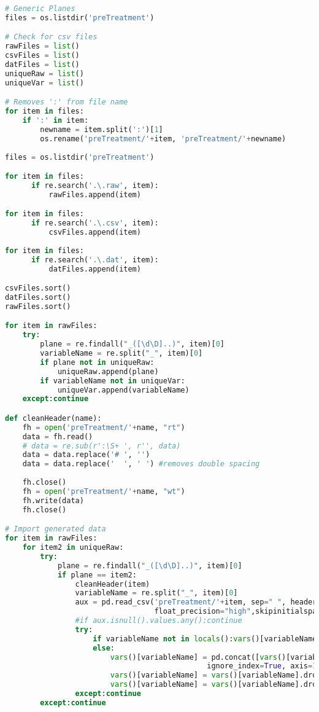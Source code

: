 \begin{lstlisting}[language=python]
# Generic Planes
files = os.listdir('preTreatment')

# Check for csv files
rawFiles = list()
csvFiles = list()
datFiles = list()
uniqueRaw = list()
uniqueVar = list()

# Removes ':' from file name
for item in files:
    if ':' in item:    
        newname = item.split(':')[1]
        os.rename('preTreatment/'+item, 'preTreatment/'+newname)
        
files = os.listdir('preTreatment')

for item in files:
      if re.search('.\.raw', item):
          rawFiles.append(item)

for item in files:
      if re.search('.\.csv', item):
          csvFiles.append(item)
          
for item in files:
      if re.search('.\.dat', item):
          datFiles.append(item)

csvFiles.sort() 
datFiles.sort() 
rawFiles.sort()

for item in rawFiles:
    try:
        plane = re.findall("_([\d\D]..)", item)[0]
        variableName = re.split("_", item)[0]
        if plane not in uniqueRaw:
            uniqueRaw.append(plane)
        if variableName not in uniqueVar:
            uniqueVar.append(variableName)
    except:continue

def cleanHeader(name):
    fh = open('preTreatment/'+name, "rt")
    data = fh.read()
    # data = re.sub(r':\S+ ', r'', data)
    data = data.replace('# ', '')
    data = data.replace('  ', ' ') #removes double spacing
    
    fh.close()
    fh = open('preTreatment/'+name, "wt")
    fh.write(data)
    fh.close()

# Import generated data
for item in rawFiles:
    for item2 in uniqueRaw:
        try:
            plane = re.findall("_([\d\D]..)", item)[0]
            if plane == item2:
                cleanHeader(item)
                variableName = re.split("_", item)[0]
                aux = pd.read_csv('preTreatment/'+item, sep=" ", header=1,
                                  float_precision="high",skipinitialspace=True)
                #if aux.isnull().values.any():continue
                try:
                    if variableName not in locals():vars()[variableName] = aux
                    else:
                        vars()[variableName] = pd.concat([vars()[variableName],aux],
                                              ignore_index=True, axis=1)
                        vars()[variableName] = vars()[variableName].dropna(axis=0, how='all')
                        vars()[variableName] = vars()[variableName].dropna(axis=1, how='all')
                except:continue
        except:continue


\end{lstlisting}
